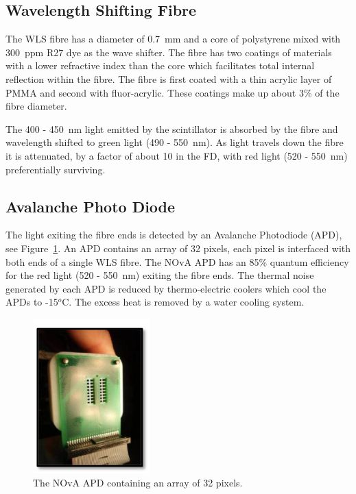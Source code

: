 \subsection{Wavelength Shifting Fibre}
The WLS fibre has a diameter of 0.7~mm and a core of polystyrene mixed
with 300~ppm R27 dye as the wave shifter. The fibre has two coatings
of materials with a lower refractive index than the core which
facilitates total internal reflection within the fibre. The fibre is
first coated with a thin acrylic layer of PMMA and second with
fluor-acrylic. These coatings make up about 3\% of the fibre
diameter. 

The 400 - 450~nm light emitted by the scintillator is absorbed by the
fibre and wavelength shifted to green light (490 - 550~nm). 
As light travels down the fibre it is attenuated, by a factor of about
10 in the FD, with red light (520 - 550~nm) preferentially
surviving. 


\subsection{Avalanche Photo Diode}

The light exiting the fibre ends is detected by an Avalanche
Photodiode (APD), see Figure~\ref{fig:apd}. An APD contains an array
of 32 pixels, each pixel is interfaced with both ends of a single WLS
fibre. The NOvA APD has an 85\% quantum efficiency for the red light (520 -
550~nm) exiting the fibre ends. 
The thermal noise generated by each APD is reduced by thermo-electric
coolers which cool the APDs to -15$^o$C. The excess heat is removed by
a water cooling system.



\begin{figure}
  \centering
  \includegraphics[width=0.4\textwidth]{../../img/det/gen/APD.png}
  \caption{The NOvA APD containing an array of 32 pixels.}
  \label{fig:apd}
\end{figure}


